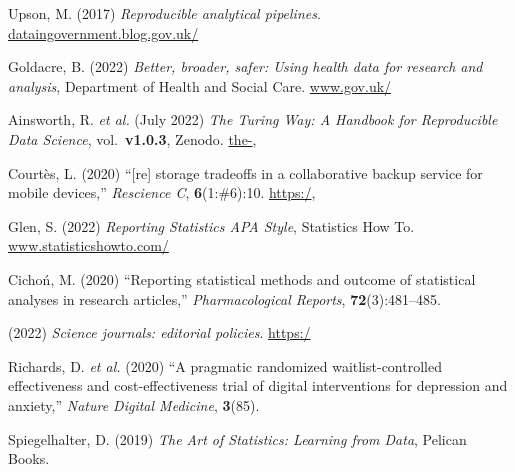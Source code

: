 \documentclass{comjnl}
\begin{document}
{\begin{thebibliography}{100}
Upson, M. (2017) {\em Reproducible analytical pipelines}.
\newblock
  \url{dataingovernment.blog.gov.uk/}

Goldacre, B. (2022) {\em Better, broader, safer: {Using} health data for
  research and analysis}, Department of Health and Social Care.
\newblock
  \url{www.gov.uk/}

Ainsworth, R. \emph{et al.} (July 2022) {\em {The Turing Way: A Handbook for
  Reproducible Data Science}}, vol.~\textbf{v1.0.3}, Zenodo.
\newblock \url{the-},

Court{\`e}s, L. (2020) ``[re] storage tradeoffs in a collaborative backup
  service for mobile devices,'' {\em Rescience C}, \textbf{6}(1:{\#}6):10.
\newblock
  \url{https:/}\midurl{/},

Glen, S. (2022) {\em Reporting Statistics APA Style}, Statistics How To.
\newblock
  \url{www.statisticshowto.com/}

Cicho{\'n}, M. (2020) ``Reporting statistical methods and outcome of
  statistical analyses in research articles,'' {\em Pharmacological Reports},
  \textbf{72}(3):481--485.
\newblock {}

 (2022) {\em Science journals: editorial policies}.
\newblock
  \url{https:/}\midurl{/}

Richards, D. \emph{et al.} (2020) ``A pragmatic randomized waitlist-controlled
  effectiveness and cost-effectiveness trial of digital interventions for
  depression and anxiety,'' {\em Nature Digital Medicine}, \textbf{3}(85).
\newblock {}

Spiegelhalter, D. (2019) {\em The Art of Statistics: Learning from Data},
  Pelican Books.


\end{thebibliography}}
\end{document}
